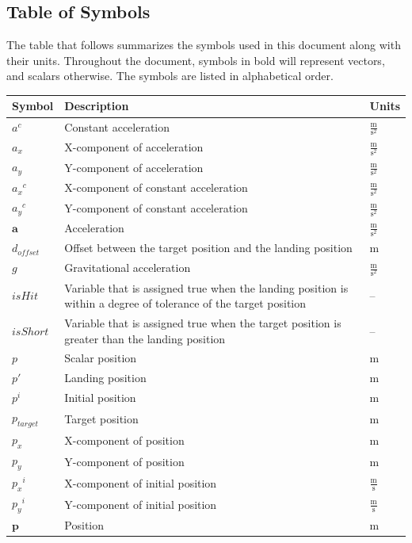 \documentclass[12pt]{article}
\begin{document}
\subsection{Table of Symbols}
\label{Sec:ToS}
The table that follows summarizes the symbols used in this document along with their units. Throughout the document, symbols in bold will represent vectors, and scalars otherwise. The symbols are listed in alphabetical order.
\begin{longtabu}{l X[l] l}
\toprule
Symbol & Description & Units
\\
\midrule
\endhead
${a^{c}}$ & Constant acceleration & $\frac{\text{m}}{\text{s}^{2}}$
\\
${a_{x}}$ & X-component of acceleration & $\frac{\text{m}}{\text{s}^{2}}$
\\
${a_{y}}$ & Y-component of acceleration & $\frac{\text{m}}{\text{s}^{2}}$
\\
${{a_{x}}^{c}}$ & X-component of constant acceleration & $\frac{\text{m}}{\text{s}^{2}}$
\\
${{a_{y}}^{c}}$ & Y-component of constant acceleration & $\frac{\text{m}}{\text{s}^{2}}$
\\
$\mathbf{a}$ & Acceleration & $\frac{\text{m}}{\text{s}^{2}}$
\\
${d_{offset}}$ & Offset between the target position and the landing position & m
\\
$g$ & Gravitational acceleration & $\frac{\text{m}}{\text{s}^{2}}$
\\
$isHit$ & Variable that is assigned true when the landing position is within a degree of tolerance of the target position & --
\\
$isShort$ & Variable that is assigned true when the target position is greater than the landing position & --
\\
$p$ & Scalar position & m
\\
$p'$ & Landing position & m
\\
${p^{i}}$ & Initial position & m
\\
${p_{target}}$ & Target position & m
\\
${p_{x}}$ & X-component of position & m
\\
${p_{y}}$ & Y-component of position & m
\\
${{p_{x}}^{i}}$ & X-component of initial position & $\frac{\text{m}}{\text{s}}$
\\
${{p_{y}}^{i}}$ & Y-component of initial position & $\frac{\text{m}}{\text{s}}$
\\
$\mathbf{p}$ & Position & m

\end{longtabu}
\end{document}
